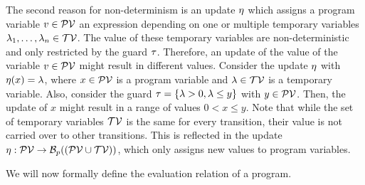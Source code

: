 The second reason for non-determinism is an update $\eta$ which assigns a program variable $v \in \mathcal{PV}$ an expression depending on one or multiple temporary variables $\lambda_1, \dots, \lambda_n \in \mathcal{TV}$.
The value of these temporary variables are non-deterministic and only restricted by the guard $\tau$.
Therefore, an update of the value of the variable $v \in \mathcal{PV}$ might result in different values.
Consider the update $\eta$ with $\eta(x) = \lambda$, where $x \in \mathcal{PV}$ is a program variable and $\lambda \in \mathcal{TV}$ is a temporary variable.
Also, consider the guard $\tau = \lbrace \lambda > 0, \lambda \leq y \rbrace$ with $y \in \mathcal{PV}$.
Then, the update of $x$ might result in a range of values $0 < x \leq y$. 
Note that while the set of temporary variables $\mathcal{TV}$ is the same for every transition, their value is not carried over to other transitions.
This is reflected in the update $\eta: \mathcal{PV} \rightarrow \mathcal{B}_p((\mathcal{PV} \cup \mathcal{TV}))$, which only assigns new values to program variables.

We will now formally define the evaluation relation of a program.

